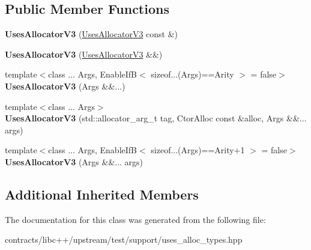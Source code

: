 \subsection*{Public Member Functions}
\begin{DoxyCompactItemize}
\item 
\mbox{\label{class_uses_allocator_v3_a9bb97b06056fe7fc6a83b0d68a1b4add}} 
{\bfseries Uses\+Allocator\+V3} (\mbox{\hyperlink{class_uses_allocator_v3}{Uses\+Allocator\+V3}} const \&)
\item 
\mbox{\label{class_uses_allocator_v3_a7a8530025c17e544a56f806d1f52d7ff}} 
{\bfseries Uses\+Allocator\+V3} (\mbox{\hyperlink{class_uses_allocator_v3}{Uses\+Allocator\+V3}} \&\&)
\item 
\mbox{\label{class_uses_allocator_v3_aa07845d8d0164ee4bf0ea88222ca79cf}} 
{\footnotesize template$<$class ... Args, Enable\+If\+B$<$ sizeof...(\+Args)==\+Arity $>$  = false$>$ }\\{\bfseries Uses\+Allocator\+V3} (Args \&\&...)
\item 
\mbox{\label{class_uses_allocator_v3_aa096ef02dda5567e94933fbb7bbb3db1}} 
{\footnotesize template$<$class ... Args$>$ }\\{\bfseries Uses\+Allocator\+V3} (std\+::allocator\+\_\+arg\+\_\+t tag, Ctor\+Alloc const \&alloc, Args \&\&... args)
\item 
\mbox{\label{class_uses_allocator_v3_a490f59b5f446d2698353039d5fc77edc}} 
{\footnotesize template$<$class ... Args, Enable\+If\+B$<$ sizeof...(\+Args)==\+Arity+1 $>$  = false$>$ }\\{\bfseries Uses\+Allocator\+V3} (Args \&\&... args)
\end{DoxyCompactItemize}
\subsection*{Additional Inherited Members}


The documentation for this class was generated from the following file\+:\begin{DoxyCompactItemize}
\item 
contracts/libc++/upstream/test/support/uses\+\_\+alloc\+\_\+types.\+hpp\end{DoxyCompactItemize}
